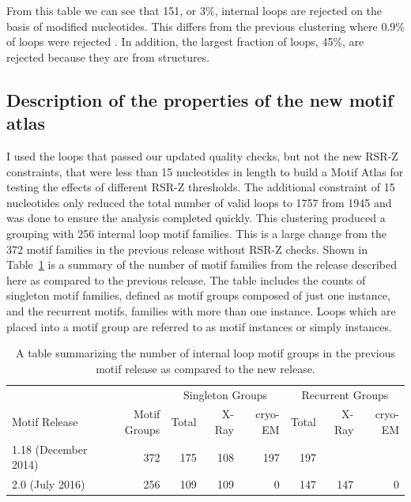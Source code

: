 From this table we can see that 151, or 3\%, internal loops are rejected on the
basis of modified nucleotides. This differs from the previous clustering where
0.9\% of loops were rejected \cite{Petrov2012}. In addition, the largest
fraction of loops, 45\%, are rejected because they are from \cyem{} structures.

\subsection{Description of the properties of the new motif atlas}

I used the loops that passed our updated quality checks, but not the new RSR-Z
constraints, that were less than 15 nucleotides in length to build a Motif Atlas
for testing the effects of different RSR-Z thresholds. The additional constraint
of 15 nucleotides only reduced the total number of valid loops to 1757 from 1945
and was done to ensure the analysis completed quickly. This clustering produced
a grouping with 256 internal loop motif families. This is a large change from
the 372 motif families in the previous release without RSR-Z checks. Shown in
Table~\ref{tab:loop-counts} is a summary of the number of motif families from
the release described here as compared to the previous release. The table
includes the counts of singleton motif families, defined as motif groups
composed of just one instance, and the recurrent motifs, families with more than
one instance. Loops which are placed into a motif group are referred to as motif
instances or simply instances.

\begin{table}
  \begin{tabular}{lrrrrrrr}
    \toprule
                  &                                      & \multicolumn{3}{c}{Singleton Groups} & \multicolumn{3}{c}{Recurrent Groups} \\
    \cmidrule(r){3-5} \cmidrule(r){6-8}
    Motif Release &
      Motif Groups &
      Total & X-Ray & cryo-EM &
      Total & X-Ray & cryo-EM \\
    \midrule
    1.18 (December 2014) & 372 & 175 & 108 & 197 & 197 &     &   \\
    2.0 (July 2016)      & 256 & 109 & 109 & 0   & 147 & 147 & 0 \\
    \bottomrule
  \end{tabular}
  \caption{A table summarizing the number of internal loop motif groups in the
  previous motif release as compared to the new release. }
  \label{tab:loop-counts}
\end{table}

